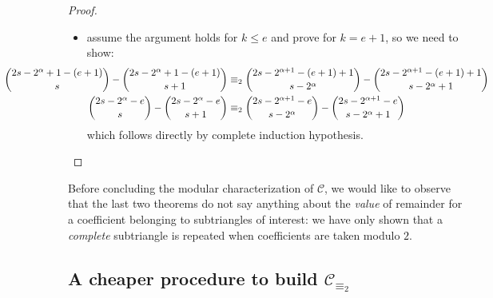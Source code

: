 \begin{proof}
\begin{itemize}
        \item assume the argument holds for $k\leq e$ and prove for $k=e+1$, so we need to show:
            \begin{displaymath}
                \hspace{-3cm}
                \begin{split}
                    {{2s-2^{{\alpha}}+1-(e+1)}\choose{s}} - {{2s-2^{{\alpha}}+1-(e+1)}\choose{s+1}}
                    &\equiv_{2}
                    {{2s-2^{{\alpha}+1}-(e+1)+1}\choose{s-2^{{\alpha}}}} - {{2s-2^{{\alpha}+1}-(e+1)+1}\choose{s-2^{{\alpha}}+1}}\\
                    {{2s-2^{{\alpha}}-e}\choose{s}} - {{2s-2^{{\alpha}}-e}\choose{s+1}}
                    &\equiv_{2}
                    {{2s-2^{{\alpha}+1}-e}\choose{s-2^{{\alpha}}}} - {{2s-2^{{\alpha}+1}-e}\choose{s-2^{{\alpha}}+1}}\\
                \end{split}
            \end{displaymath}
            which follows directly by complete induction hypothesis.
    \end{itemize}
\end{proof}



Before concluding the modular characterization of $\mathcal{C}$, 
we would like to observe that the last two
theorems do not say anything about the \emph{value} of remainder for 
a coefficient belonging to subtriangles of interest: 
we have only shown that a \emph{complete} subtriangle is repeated 
when coefficients are taken modulo $2$. 

\subsection{A cheaper procedure to build $\mathcal{C}_{\equiv_{2}}$}

